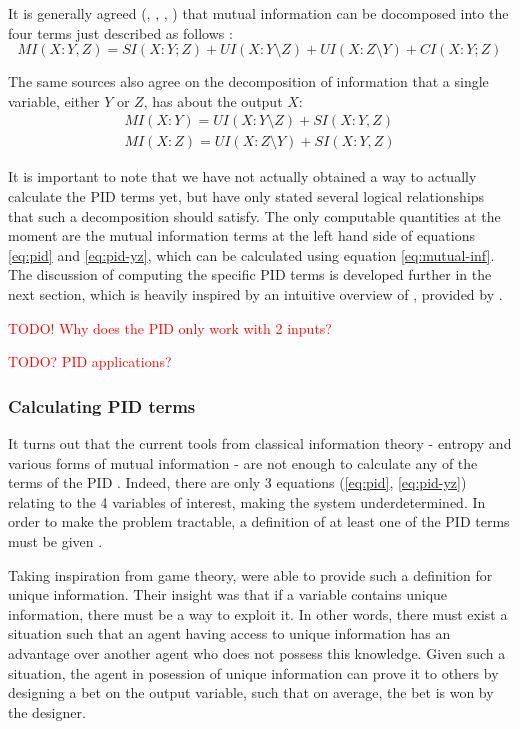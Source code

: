 \documentclass[12pt]{article}
\begin{document}
It is generally agreed (\cite{williams-beer}, \cite{bertschinger}, \cite{pid-redundant}, \cite{pid-synergy}) that mutual information can be docomposed into the four terms just described as follows \cite{pid-goal-functions}:
\begin{equation}
MI(X:Y,Z) = SI(X:Y;Z) + UI(X:Y \setminus Z) + UI(X:Z \setminus Y) + CI(X:Y;Z)
\label{eq:pid}
\end{equation}

The same sources also agree on the decomposition of information that a single variable, either $Y$ or $Z$, has about the output $X$: 
\begin{equation}
\begin{split}
MI(X:Y) = UI(X:Y \setminus Z) + SI(X:Y,Z) \\
MI(X:Z) = UI(X:Z \setminus Y) + SI(X:Y,Z)
\label{eq:pid-yz}
\end{split}
\end{equation}

It is important to note that we have not actually obtained a way to actually calculate the PID terms yet, but have only stated several logical relationships that such a decomposition should satisfy. The only computable quantities at the moment are the mutual information terms at the left hand side of equations \ref{eq:pid} and \ref{eq:pid-yz}, which can be calculated using equation \ref{eq:mutual-inf}. The discussion of computing the specific PID terms is developed further in the next section, which is heavily inspired by an intuitive overview of \cite{bertschinger}, provided by \cite{pid-goal-functions}. 

\textcolor{red}{TODO! Why does the PID only work with 2 inputs?}

\textcolor{red}{TODO? PID applications?}

\subsubsection{Calculating PID terms}

It turns out that the current tools from classical information theory - entropy and various forms of mutual information - are not enough to calculate any of the terms of the PID \cite{williams-beer}. Indeed, there are only 3 equations (\ref{eq:pid}, \ref{eq:pid-yz}) relating to the 4 variables of interest, making the system underdetermined. In order to make the problem tractable, a definition of at least one of the PID terms must be given \cite{bertschinger}.

Taking inspiration from game theory, \cite{bertschinger} were able to provide such a definition for unique information. Their insight was that if a variable contains unique information, there must be a way to exploit it. In other words, there must exist a situation such that an agent having access to unique information has an advantage over another agent who does not possess this knowledge. Given such a situation, the agent in posession of unique information can prove it to others by designing a bet on the output variable, such that on average, the bet is won by the designer.
\end{document}
